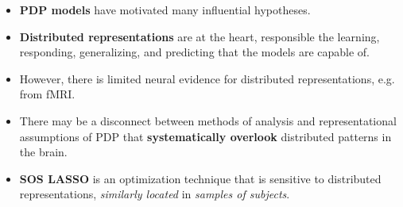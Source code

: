 \begin{itemize}\compresslist

\item {\bf PDP models} have motivated many influential hypotheses. 

\item {\bf Distributed representations} are at the heart, responsible the learning, responding, generalizing, and predicting that the models are capable of.

\item However, there is limited neural evidence for distributed representations, e.g. from fMRI.

\item There may be a disconnect between methods of analysis and representational assumptions of PDP that {\bf systematically overlook} distributed patterns in the brain. 

\item {\bf SOS LASSO} is an optimization technique that is sensitive to distributed representations, {\em similarly located} in {\em samples of subjects}. 

\end{itemize}